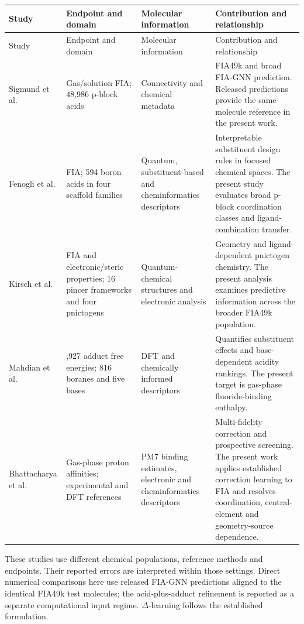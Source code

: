 {\footnotesize\setlength{\tabcolsep}{3pt}
\begin{longtable}{@{}>{\raggedright\arraybackslash}p{}>{\raggedright\arraybackslash}p{}>{\raggedright\arraybackslash}p{}>{\raggedright\arraybackslash}p{}@{}}
\toprule
Study & Endpoint and domain & Molecular information & Contribution and relationship \\ \midrule
\endfirsthead
\toprule
Study & Endpoint and domain & Molecular information & Contribution and relationship \\ \midrule
\endhead
Sigmund et al. \cite{sigmund2024fia} & Gas/solution FIA; 48,986 p-block acids & Connectivity and chemical metadata & FIA49k and broad FIA-GNN prediction. Released predictions provide the same-molecule reference in the present work. \\
Fenogli et al. \cite{fenogli2025boron} & FIA; 594 boron acids in four scaffold families & Quantum, substituent-based and cheminformatics descriptors & Interpretable substituent design rules in focused chemical spaces. The present study evaluates broad p-block coordination classes and ligand-combination transfer. \\
Kirsch et al. \cite{kirsch2025pnictogen} & FIA and electronic/steric properties; 16 pincer frameworks and four pnictogens & Quantum-chemical structures and electronic analysis & Geometry and ligand-dependent pnictogen chemistry. The present analysis examines predictive information across the broader FIA49k population. \\
Mahdian et al. \cite{mahdian2026base} & 3,927 adduct free energies; 816 boranes and five bases & DFT and chemically informed descriptors & Quantifies substituent effects and base-dependent acidity rankings. The present target is gas-phase fluoride-binding enthalpy. \\
Bhattacharya et al. \cite{bhattacharya2026proton} & Gas-phase proton affinities; experimental and DFT references & PM7 binding estimates, electronic and cheminformatics descriptors & Multi-fidelity correction and prospective screening. The present work applies established correction learning to FIA and resolves coordination, central-element and geometry-source dependence. \\
\bottomrule
\end{longtable}
}

These studies use different chemical populations, reference methods and endpoints. Their reported errors are interpreted within those settings. Direct numerical comparisons here use released FIA-GNN predictions aligned to the identical FIA49k test molecules; the acid-plus-adduct refinement is reported as a separate computational input regime. $\Delta$-learning follows the established formulation. \cite{ramakrishnan2015delta}

